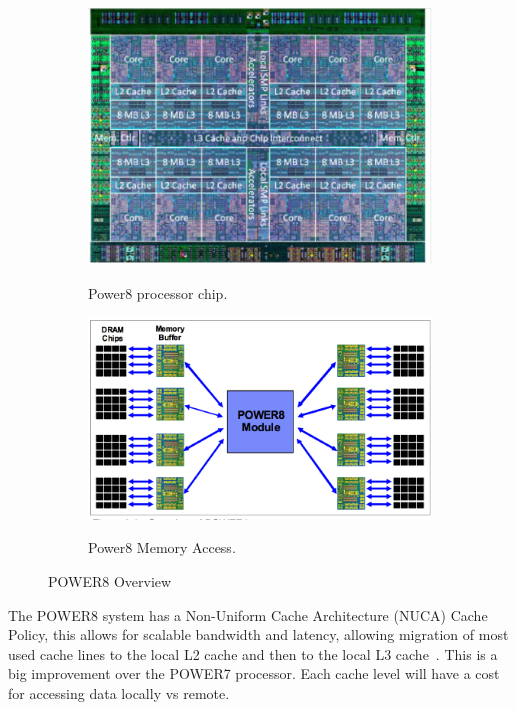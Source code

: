 \begin{figure}
    \centering
    \begin{subfigure}[b]{0.4\textwidth}
         {\includegraphics[width=1.0\textwidth]{./Images/P8.pdf}}
	 \caption{Power8 processor chip.~\cite{IBM_P8}}
 	 \label{fig:p8_1}
    \end{subfigure}
     \centering
    \begin{subfigure}[b]{0.4\textwidth}
         {\includegraphics[height=0.7\textwidth]{./Images/P8_memory.pdf}}
	 \caption{Power8 Memory Access.~\cite{IBM_P8}}
	  \label{fig:p8_2}
    \end{subfigure}
  \caption{POWER8 Overview}\label{fig:POWER8}
\end{figure}
The POWER8 system has a Non-Uniform Cache Architecture (NUCA) Cache Policy, this allows for scalable bandwidth and latency, allowing migration of most used cache lines to the local L2 cache and then to the local L3 cache~\cite{IBM_P8}. This is a big improvement over the POWER7 processor.  Each cache level will have a cost for accessing data locally vs remote.  

